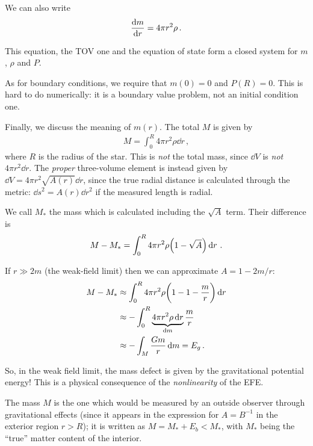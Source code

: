 \documentclass[main.tex]{subfiles}
\begin{document}
We can also write 
%
\begin{align}
\dv{m}{r} = 4 \pi r^2 \rho 
\,.
\end{align}

This equation, the TOV one and the equation of state form a closed system for \(m\), \(\rho \) and \(P\). 

As for boundary conditions, we require that \(m(0) = 0\) and \(P(R) = 0\). 
This is hard to do numerically: it is a boundary value problem, not an initial condition one. 

Finally, we discuss the meaning of \(m(r)\). 
The total \(M\) is given by 
%
\begin{align}
M = \int_{0}^{R} 4 \pi r^2 \rho \dd{r}
\,,
\end{align}
%
where \(R\) is the radius of the star. This is \emph{not} the total mass, since \(\dd{V}\) is \emph{not} \(4 \pi r^2 \dd{r}\). 
The \emph{proper} three-volume element is instead given by \(\dd{V} = 4 \pi r^2 \sqrt{A(r)} \dd{r}\), since the true radial distance is calculated through the metric: \(\dd{s^2} = A(r) \dd{r^2}\) if the measured length is radial. 

We call \(M_*\) the mass which is calculated including the \(\sqrt{A}\) term. Their difference is 
%
\begin{align}
M - M_* = \int_{0}^{R} 4 \pi r^2 \rho \qty(1 - \sqrt{A}) \dd{r}
\,.
\end{align}
 
If \(r \gg 2m\) (the weak-field limit) then we can approximate \(A = 1 - 2m /r\):
%
\begin{align}
M - M_* &\approx \int_{0}^{R} 4 \pi r^2 \rho \qty(1 - 1 - \frac{m}{r}) \dd{r}    \\
&\approx - \int_{0}^{R} \underbrace{4 \pi r^2 \rho \dd{r}}_{ \dd{m}} \frac{m}{r}   \\
&\approx - \int_{M} \frac{Gm}{r} \dd{m} = E_g
\,.
\end{align}

So, in the weak field limit, the mass defect is given by the gravitational potential energy! 
This is a physical consequence of the \emph{nonlinearity} of the EFE. 

The mass \(M\) is the one which would be measured by an outside observer through gravitational effects (since it appears in the expression for \(A = B^{-1}\) in the exterior region \(r > R\)); it is written as \(M = M_* + E_b < M_*\), with \(M_*\) being the ``true'' matter content of the interior. 
\end{document}
